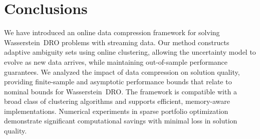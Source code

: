 \documentclass[12pt]{article}
\newcommand{\bnote}[1]{\textcolor{purple}{\textbf{[B: #1]}}}
\newcommand{\eps}{\varepsilon^K}
\newcommand{\barp}{p}
\begin{document}




\ifpreprint
\section{Conclusions}
\label{sec:conclusions}
We have introduced an online data compression framework for solving Wasserstein~\gls{DRO} problems with streaming data. 
Our method constructs adaptive ambiguity sets using online clustering, allowing the uncertainty model to evolve as new data arrives, while maintaining out-of-sample performance guarantees. 
We analyzed the impact of data compression on solution quality, providing finite-sample and asymptotic performance bounds that relate to nominal bounds for Wasserstein~\gls{DRO}.
The framework is compatible with a broad class of clustering algorithms and supports efficient, memory-aware implementations. 
Numerical experiments in sparse portfolio optimization demonstrate significant computational savings with minimal loss in solution quality.
\end{document}
